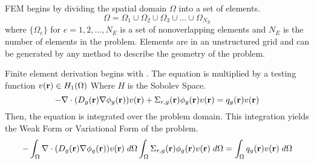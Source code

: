     FEM begins by dividing the spatial domain $\Omega$
    into a set of elements.
    \[ \Omega = \Omega_1 \cup \Omega_2 \cup \Omega_3 \cup \ldots \cup
      \Omega_{N_E} \]
    where $\{\Omega_e\}$ for $e = 1,2,\ldots,N_E$ is a set of
    nonoverlapping elements and $N_E$ is the number of elements in the problem.
    Elements are in an unstructured grid and can be generated by any method to
    describe the geometry of the problem.
    
    Finite element derivation begins with .
    The equation is multiplied by a testing function $v(\mathbf{r}) \in H_1(\Omega)$ 
    Where $H$ is the Sobolev Space. 
    \begin{equation}
      -\mathbf{\nabla} \cdot (D_g(\mathbf{r}) \mathbf{\nabla} \phi_g(\mathbf{r})) v(\mathbf{r}) + 
        \Sigma_{r,g}(\mathbf{r}) \phi_g(\mathbf{r}) v(\mathbf{r}) =
        q_g(\mathbf{r}) v(\mathbf{r})
    \end{equation}
    Then, the equation is integrated over the problem domain. This integration
    yields the Weak Form or Variational Form of the problem.
    \begin{equation}
      - \int_{\Omega} \mathbf{\nabla} \cdot (D_g(\mathbf{r}) \mathbf{\nabla} \phi_g(\mathbf{r})) v(\mathbf{r}) \; d\Omega
        \int_{\Omega} \Sigma_{r,g}(\mathbf{r}) \phi_g(\mathbf{r}) v(\mathbf{r}) \;d\Omega =
        \int_{\Omega} q_g(\mathbf{r}) v(\mathbf{r}) \;d\Omega
    \end{equation}
    
